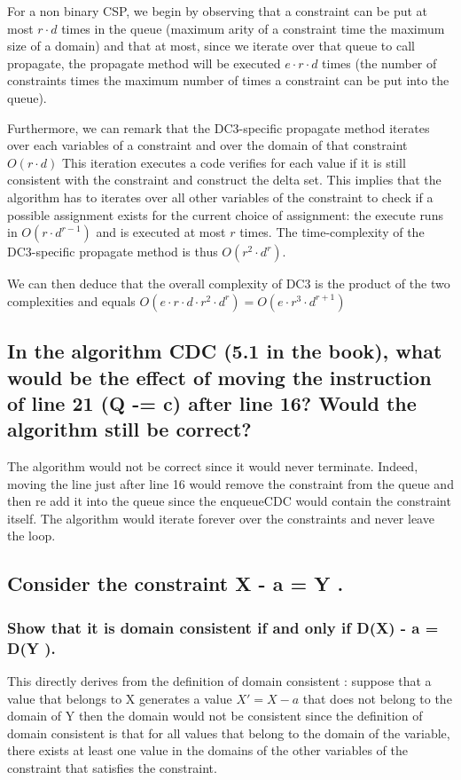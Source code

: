 \documentclass[a4paper ,12pt,french]{article}
\begin{document}
For a non binary CSP, we begin by observing that a constraint can be put at most $r\cdot d$ times in the queue (maximum arity of a constraint time the maximum size of a domain) and that at most, since we iterate over that queue to call propagate, the propagate method will be executed $e\cdot r\cdot d$ times (the number of constraints times the maximum number of times a constraint can be put into the queue). 

Furthermore, we can remark that the DC3-specific propagate method iterates over each variables of a constraint and over the domain of that constraint $O(r\cdot d)$ This iteration executes a code verifies for each value if it is still consistent with the constraint and construct the delta set. This implies that the algorithm has to iterates over all other variables of the constraint to check if a possible assignment exists for the current choice of assignment: the execute runs in $O(r\cdot d^{r-1})$ and is executed at most $r$ times. The time-complexity of the DC3-specific propagate method is thus $O(r^2 \cdot d^{r})$.

We can then deduce that the overall complexity of DC3 is the product of the two complexities and equals $O(e\cdot r\cdot d\cdot r^2\cdot d^{r}) = O(e\cdot r^3 \cdot d^{r+1})$
\subsection{In the algorithm CDC (5.1 in the book), what would be the effect of moving the instruction of line 21 (Q -= c) after line 16? Would the algorithm still be correct?}
The algorithm would not be correct since it would never terminate. Indeed, moving the line just after line 16 would remove the constraint from the queue and then re add it into the queue since the enqueueCDC would contain the constraint itself. The algorithm would iterate forever over the constraints and never leave the loop. 
\subsection{Consider the constraint X - a = Y .}
\subsubsection{Show that it is domain consistent if and only if D(X) - a = D(Y ).}
This directly derives from the definition of domain consistent : suppose that a value that belongs to X generates a value $X' = X - a$ that does not belong to the domain of Y then the domain would not be consistent since the definition of domain consistent is that for all values that belong to the domain of the variable, there exists at least one value in the domains of the other variables of the constraint that satisfies the constraint. 
\end{document}
